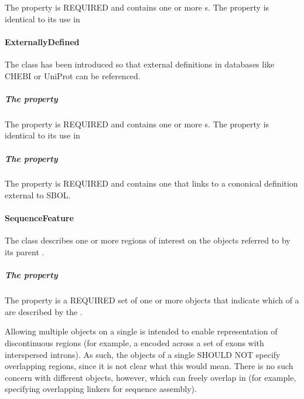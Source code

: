 The  property is REQUIRED and contains one or more s. The  property is identical to its use in 

\paragraph{ExternallyDefined}
\label{sec:ExternallyDefined}

The  class has been introduced so that external definitions in databases like CHEBI or UniProt can be referenced.

\subparagraph{The  property}\label{sec:type:ED}

The  property is REQUIRED and contains one or more s. The  property is identical to its use in 

\subparagraph{The  property}\label{sec:definition:ER}

The  property is REQUIRED and contains one  that links to a cononical definition external to SBOL.


\paragraph{SequenceFeature}
\label{sec:SequenceFeature}

The  class describes one or more regions of interest on the  objects referred to by its parent . 

\subparagraph{The  property}\label{sec:locations}
The  property is a REQUIRED set of one or more  objects that indicate which  of a  are described by the .

Allowing multiple  objects on a single  is intended to enable representation of discontinuous regions (for example, a  encoded across a set of exons with interspersed introns).
As such, the  objects of a single  SHOULD NOT specify overlapping regions, since it is not clear what this would mean.
There is no such concern with different  objects, however, which can freely overlap in  (for example, specifying overlapping linkers for sequence assembly).
